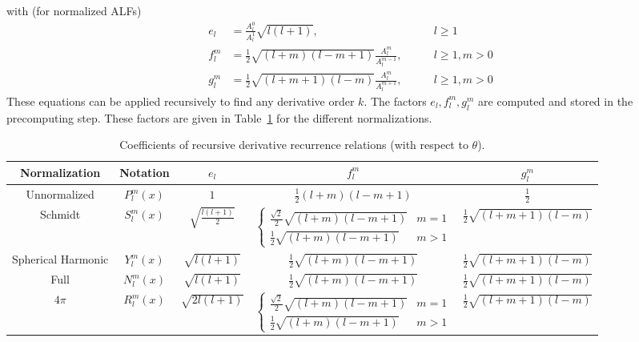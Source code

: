 \documentclass[12pt]{article}
\begin{document}
with (for normalized ALFs)
\begin{subequations}
\begin{alignat}{3}
e_l &= \frac{A_l^0}{A_l^1} \sqrt{l(l+1)}, & \qquad l \geq 1 \\
f_l^m &= \frac{1}{2} \sqrt{(l+m)(l-m+1)} \frac{A_l^m}{A_l^{m-1}}, & \qquad l \geq 1, m > 0 \\
g_l^m &= \frac{1}{2} \sqrt{(l+m+1)(l-m)} \frac{A_l^m}{A_l^{m+1}}, & \qquad l \geq 1, m > 0
\end{alignat}
\end{subequations}
These equations can be applied recursively to find any derivative order
$k$. The factors $e_l,f_l^m,g_l^m$ are computed and stored in the precomputing step.
These factors are given in Table~\ref{tab:recurrence2} for the different normalizations.

\begin{table}[ht]
\centering
\scriptsize
\caption{Coefficients of recursive derivative recurrence relations (with respect to $\theta$).}
\begin{tabular}{@{}ccccc@{}}
\toprule
Normalization & Notation & $e_l$ & $f_l^m$ & $g_l^m$ \\
\midrule
Unnormalized & $P_l^m(x)$ & $1$ & $\frac{1}{2}(l+m)(l-m+1)$ & $\frac{1}{2}$ \\
Schmidt & $S_l^m(x)$ & $\sqrt{\frac{l(l+1)}{2}}$ & $\left\{ \begin{array}{cc} \frac{\sqrt{2}}{2} \sqrt{(l+m)(l-m+1)} & m = 1 \\ \frac{1}{2} \sqrt{(l+m)(l-m+1)} & m > 1 \end{array} \right.$ & $\frac{1}{2} \sqrt{(l+m+1)(l-m)}$ \\
Spherical Harmonic & $Y_l^m(x)$ & $\sqrt{l(l+1)}$ & $\frac{1}{2} \sqrt{(l+m)(l-m+1)}$ & $\frac{1}{2} \sqrt{(l+m+1)(l-m)}$ \\
Full & $N_l^m(x)$ & $\sqrt{l(l+1)}$ & $\frac{1}{2} \sqrt{(l+m)(l-m+1)}$ & $\frac{1}{2} \sqrt{(l+m+1)(l-m)}$ \\
$4\pi$ & $R_l^m(x)$ & $\sqrt{2l(l+1)}$ & $\left\{ \begin{array}{cc} \frac{\sqrt{2}}{2} \sqrt{(l+m)(l-m+1)} & m = 1 \\ \frac{1}{2} \sqrt{(l+m)(l-m+1)} & m > 1 \end{array} \right.$ & $\frac{1}{2} \sqrt{(l+m+1)(l-m)}$ \\
\bottomrule
\end{tabular}
\label{tab:recurrence2}
\end{table}
\end{document}
